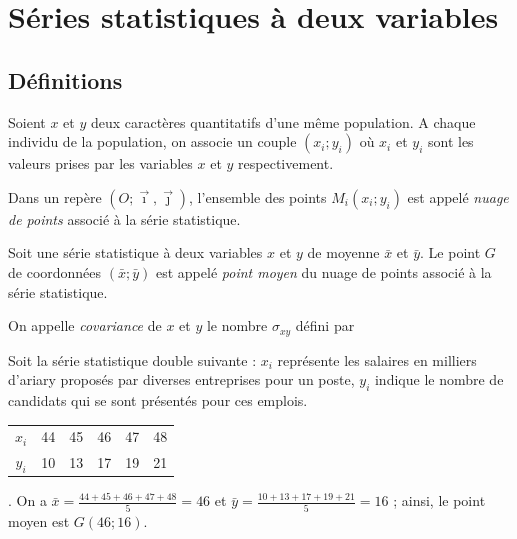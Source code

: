       \section{S\'eries statistiques \`a deux variables}
      		\subsection{D\'efinitions}
            \begin{defi}
                  Soient $x$ et $y$ deux caract\`eres quantitatifs d'une m\^eme population.
                  A chaque individu de la population, on associe un couple $(x_i ; y_i)$ 
                  o\`u $x_i$ et $y_i$ sont les valeurs prises par les variables $x$ et $y$ respectivement.
                  
                  Dans un rep\`ere $(O ; \vec{\imath} , \vec{\jmath})$, l'ensemble des points $M_i (x_i ; y_i)$
                  est appel\'e \emph{nuage de points} associ\'e \`a la s\'erie statistique.
                  
                  Soit une s\'erie statistique \`a deux variables $x$ et $y$ de moyenne $\bar{x}$ et $\bar{y}$.
                  Le point $G$ de coordonn\'ees $(\bar{x} ; \bar{y})$ est appel\'e \emph{point moyen}
                  du nuage de points associ\'e \`a la s\'erie statistique.
                  
                  On appelle \emph{covariance} de $x$ et $y$ le nombre $\sigma_{xy}$ d\'efini par
                  \par\smallskip\noindent
                  \par\smallskip
                  \begin{ex}
                        Soit la s\'erie statistique double suivante :
	                        $x_i$ repr\'esente les salaires en milliers d'ariary propos\'es par diverses entreprises pour un poste,
	                        $y_i$ indique le nombre de candidats qui se sont pr\'esent\'es pour ces emplois.
                        \begin{tabular}{cccccc}
                              $x_i$ & 44 & 45 & 46 & 47 & 48 \\
                              $y_i$ & 10 & 13 & 17 & 19 & 21 
                        \end{tabular}.
                        On a $\bar{x} = \frac{44 + 45 + 46 + 47 + 48}{5} = 46$
                        et $\bar{y} = \frac{10 +  13 + 17 + 19 + 21}{5} = 16$ ; 
	                        ainsi, le point moyen est $G (46 ; 16)$.
                        

\end{ex}
\end{defi}
